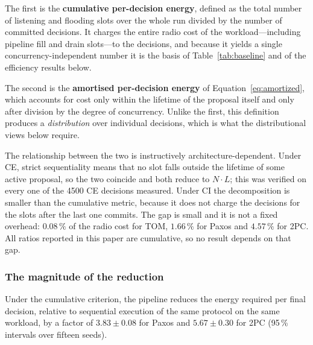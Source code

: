 \documentclass[journal]{IEEEtran}
\newcommand{\CI}{CI}                      %
\newcommand{\CE}{CE}                      %
\newcommand{\Nnodes}{N}                   %
\begin{document}
The first is the \textbf{cumulative per-decision energy}, defined as the
total number of listening and flooding slots over the whole run divided by
the number of committed decisions. It charges the entire radio cost of the
workload---including pipeline fill and drain slots---to the decisions, and
because it yields a single concurrency-independent number it is the basis
of Table~\ref{tab:baseline} and of the efficiency results below.

The second is the \textbf{amortised per-decision energy} of
Equation~\eqref{eq:amortized}, which accounts for cost only within the
lifetime of the proposal itself and only after division by the degree of
concurrency. Unlike the first, this definition produces a
\emph{distribution} over individual decisions, which is what the
distributional views below require.

The relationship between the two is instructively architecture-dependent.
Under \CE, strict sequentiality means that no slot falls outside the lifetime
of some active proposal, so the two coincide and both reduce to
$\Nnodes \cdot L$; this was verified on every one of the 4500 \CE{} decisions
measured. Under \CI{} the decomposition is smaller than the cumulative metric,
because it does not charge the decisions for the slots after the last one
commits. The gap is small and it is not a fixed overhead: $0.08\,\%$ of the
radio cost for TOM, $1.66\,\%$ for Paxos and $4.57\,\%$ for 2PC. All ratios
reported in this paper are cumulative, so no result depends on that gap.

\subsubsection{The magnitude of the reduction}


Under the cumulative criterion, the pipeline reduces the energy required
per final decision, relative to sequential execution of the same protocol
on the same workload, by a factor of $3.83 \pm 0.08$ for Paxos and
$5.67 \pm 0.30$ for 2PC (95\,\% intervals over fifteen seeds).
\end{document}

